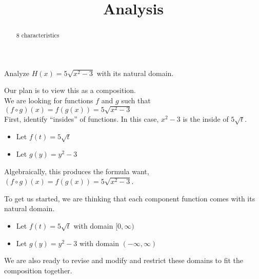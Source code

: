 \documentclass{ximera}
\title{Analysis}
\begin{document}
\begin{abstract}
8 characteristics
\end{abstract}
\maketitle












Analyze $H(x) = 5 \sqrt{x^2-3}$ with its natural domain. \\







Our plan is to view this as a composition. \\






We are looking for functions $f$ and $g$ such that $(f \circ g)(x) = f(g(x)) = 5 \sqrt{x^2-3}$ \\


First, identify ``insides'' of functions.  In this case, $x^2 - 3$ is the inside of $5 \sqrt{t}$. \\



\begin{itemize}
\item Let $f(t) = 5 \sqrt{t}$ \\
\item Let $g(y) = y^2 - 3$ \\
\end{itemize}

Algebraically, this produces the formula want, $(f \circ g)(x) = f(g(x)) = 5 \sqrt{x^2-3}$.

To get us started, we are thinking that each component function comes with its natural domain.

\begin{itemize}
\item Let $f(t) = 5 \sqrt{t}$ with domain $[0, \infty)$ \\
\item Let $g(y) = y^2 - 3$ with domain $(-\infty, \infty)$ \\
\end{itemize}

We are also ready to revise and modify and restrict these domains to fit the composition together. \\
\end{document}
